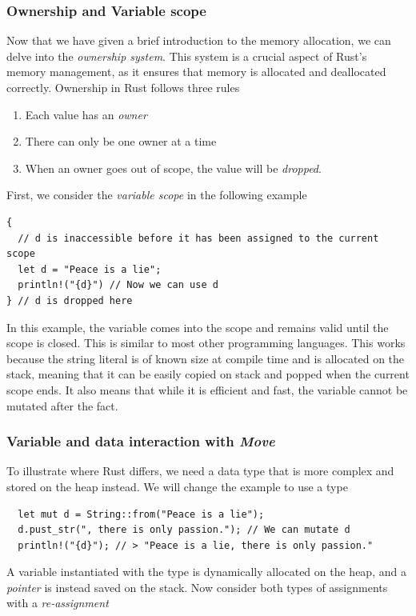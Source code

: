 \documentclass[11pt]{report}
\theoremstyle{definition}
\theoremstyle{plain}
\begin{document}
\subsubsection{Ownership and Variable scope}
Now that we have given a brief introduction to the memory allocation, we can delve into the \textit{ownership system}. This system is a crucial aspect of Rust's memory management, as it ensures that memory is allocated and deallocated correctly. Ownership in Rust follows three rules
\begin{enumerate}[parsep=0pt, itemsep=0pt, topsep=0pt]
  \item Each value has an \textit{owner}
  \item There can only be one owner at a time
  \item When an owner goes out of scope, the value will be \textit{dropped}.
\end{enumerate}
First, we consider the \textit{variable scope} in the following example
\begin{verbatim}
{
  // d is inaccessible before it has been assigned to the current scope
  let d = "Peace is a lie";
  println!("{d}") // Now we can use d
} // d is dropped here
\end{verbatim}
In this example, the variable  comes into the scope and remains valid until the scope is closed. This is similar to most other programming languages. This works because the string literal  is of known size at compile time and is allocated on the stack, meaning that it can be easily copied on stack and popped when the current scope ends. It also means that while it is efficient and fast, the variable  cannot be mutated after the fact.

\subsubsection{Variable and data interaction with \textit{Move}}

To illustrate where Rust differs, we need a data type that is more complex and stored on the heap instead. We will change the example to use a  type

\begin{verbatim}
  let mut d = String::from("Peace is a lie");
  d.pust_str(", there is only passion."); // We can mutate d
  println!("{d}"); // > "Peace is a lie, there is only passion."
\end{verbatim}

A variable instantiated with the  type is dynamically allocated on the heap, and a \textit{pointer} is instead saved on the stack. Now consider both types of assignments with a \textit{re-assignment}
\end{document}
